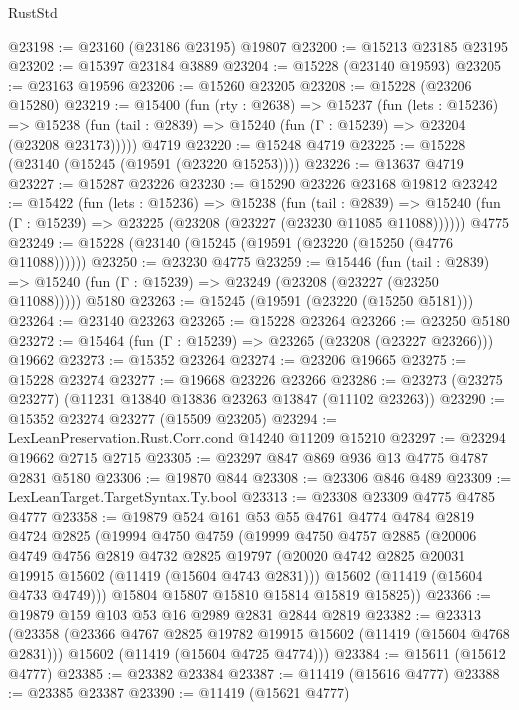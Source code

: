 \begin{lexlean}{RustStd}
\begin{coremodule}
@23198 := @23160 (@23186 @23195) @19807
@23200 := @15213 @23185 @23195
@23202 := @15397 @23184 @3889
@23204 := @15228 (@23140 @19593)
@23205 := @23163 @19596
@23206 := @15260 @23205
@23208 := @15228 (@23206 @15280)
@23219 := @15400
    (fun (rty : @2638) =>
    @15237
      (fun (lets : @15236) =>
      @15238 (fun (tail : @2839) => @15240 (fun (Γ : @15239) => @23204 (@23208 @23173)))))
    @4719
@23220 := @15248 @4719
@23225 := @15228 (@23140 (@15245 (@19591 (@23220 @15253))))
@23226 := @13637 @4719
@23227 := @15287 @23226
@23230 := @15290 @23226 @23168 @19812
@23242 := @15422
    (fun (lets : @15236) =>
    @15238
      (fun (tail : @2839) =>
      @15240 (fun (Γ : @15239) => @23225 (@23208 (@23227 (@23230 @11085 @11088))))))
    @4775
@23249 := @15228 (@23140 (@15245 (@19591 (@23220 (@15250 (@4776 @11088))))))
@23250 := @23230 @4775
@23259 := @15446
    (fun (tail : @2839) => @15240 (fun (Γ : @15239) => @23249 (@23208 (@23227 (@23250 @11088)))))
    @5180
@23263 := @15245 (@19591 (@23220 (@15250 @5181)))
@23264 := @23140 @23263
@23265 := @15228 @23264
@23266 := @23250 @5180
@23272 := @15464 (fun (Γ : @15239) => @23265 (@23208 (@23227 @23266))) @19662
@23273 := @15352 @23264
@23274 := @23206 @19665
@23275 := @15228 @23274
@23277 := @19668 @23226 @23266
@23286 := @23273 (@23275 @23277) (@11231 @13840 @13836 @23263 @13847 (@11102 @23263))
@23290 := @15352 @23274 @23277 (@15509 @23205)
@23294 := LexLeanPreservation.Rust.Corr.cond @14240 @11209 @15210
@23297 := @23294 @19662 @2715 @2715
@23305 := @23297 @847 @869 @936 @13 @4775 @4787 @2831 @5180
@23306 := @19870 @844
@23308 := @23306 @846 @489
@23309 := LexLeanTarget.TargetSyntax.Ty.bool
@23313 := @23308 @23309 @4775 @4785 @4777
@23358 := @19879
    @524
    @161
    @53
    @55
    @4761
    @4774
    @4784
    @2819
    @4724
    @2825
    (@19994
      @4750
      @4759
      (@19999
        @4750
        @4757
        @2885
        (@20006
          @4749
          @4756
          @2819
          @4732
          @2825
          @19797
          (@20020 @4742 @2825 @20031 @19915 @15602 (@11419 (@15604 @4743 @2831)))
          @15602
          (@11419 (@15604 @4733 @4749)))
        @15804
        @15807
        @15810
        @15814
        @15819
        @15825))
@23366 := @19879 @159 @103 @53 @16 @2989 @2831 @2844 @2819
@23382 := @23313
    (@23358
      (@23366 @4767 @2825 @19782 @19915 @15602 (@11419 (@15604 @4768 @2831)))
      @15602
      (@11419 (@15604 @4725 @4774)))
@23384 := @15611 (@15612 @4777)
@23385 := @23382 @23384
@23387 := @11419 (@15616 @4777)
@23388 := @23385 @23387
@23390 := @11419 (@15621 @4777)

\end{coremodule}
\end{lexlean}
